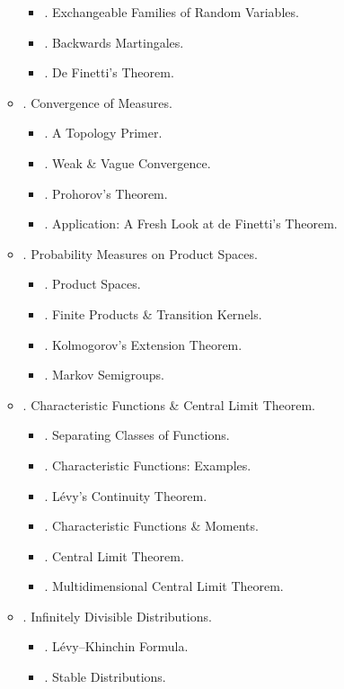 \documentclass{article}
\begin{document}
\begin{enumerate}
\begin{itemize}
		\begin{itemize}
			\item {. Exchangeable Families of Random Variables.}
			\item {. Backwards Martingales.}
			\item {. De Finetti's Theorem.}
		\end{itemize}
		\item {. Convergence of Measures.}
		\begin{itemize}
			\item {. A Topology Primer.}
			\item {. Weak \& Vague Convergence.}
			\item {. Prohorov's Theorem.}
			\item {. Application: A Fresh Look at de Finetti's Theorem.}
		\end{itemize}
		\item {. Probability Measures on Product Spaces.}
		\begin{itemize}
			\item {. Product Spaces.}
			\item {. Finite Products \& Transition Kernels.}
			\item {. Kolmogorov's Extension Theorem.}
			\item {. Markov Semigroups.}
		\end{itemize}
		\item {. Characteristic Functions \& Central Limit Theorem.}
		\begin{itemize}
			\item {. Separating Classes of Functions.}
			\item {. Characteristic Functions: Examples.}
			\item {. L\'evy's Continuity Theorem.}
			\item {. Characteristic Functions \& Moments.}
			\item {. Central Limit Theorem.}
			\item {. Multidimensional Central Limit Theorem.}
		\end{itemize}
		\item {. Infinitely Divisible Distributions.}
		\begin{itemize}
			\item {. L\'evy--Khinchin Formula.}
			\item {. Stable Distributions.}
		\end{itemize}

\end{itemize}
\end{enumerate}
\end{document}
